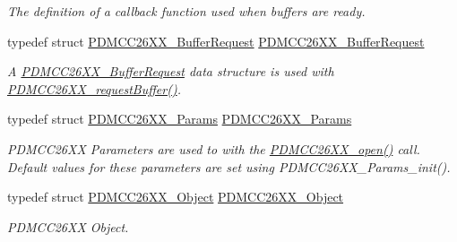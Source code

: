 \begin{DoxyCompactItemize}
\begin{DoxyCompactList}\small\item\em The definition of a callback function used when buffers are ready. \end{DoxyCompactList}\item 
typedef struct \hyperlink{struct_p_d_m_c_c26_x_x___buffer_request}{P\+D\+M\+C\+C26\+X\+X\+\_\+\+Buffer\+Request} \hyperlink{_p_d_m_c_c26_x_x_8h_ae8cebf1f4b5897234e3be6744eb26997}{P\+D\+M\+C\+C26\+X\+X\+\_\+\+Buffer\+Request}
\begin{DoxyCompactList}\small\item\em A \hyperlink{struct_p_d_m_c_c26_x_x___buffer_request}{P\+D\+M\+C\+C26\+X\+X\+\_\+\+Buffer\+Request} data structure is used with \hyperlink{_p_d_m_c_c26_x_x_8h_a15a0017513c13ca244f7e3a0f5761e8d}{P\+D\+M\+C\+C26\+X\+X\+\_\+request\+Buffer()}. \end{DoxyCompactList}\item 
typedef struct \hyperlink{struct_p_d_m_c_c26_x_x___params}{P\+D\+M\+C\+C26\+X\+X\+\_\+\+Params} \hyperlink{_p_d_m_c_c26_x_x_8h_a31104648f1849f5eef36ef1d98465a6b}{P\+D\+M\+C\+C26\+X\+X\+\_\+\+Params}
\begin{DoxyCompactList}\small\item\em P\+D\+M\+C\+C26\+X\+X Parameters are used to with the \hyperlink{_p_d_m_c_c26_x_x_8h_a431d9b71e0d0eebd5ab85960f1c82ee0}{P\+D\+M\+C\+C26\+X\+X\+\_\+open()} call. Default values for these parameters are set using P\+D\+M\+C\+C26\+X\+X\+\_\+\+Params\+\_\+init(). \end{DoxyCompactList}\item 
typedef struct \hyperlink{struct_p_d_m_c_c26_x_x___object}{P\+D\+M\+C\+C26\+X\+X\+\_\+\+Object} \hyperlink{_p_d_m_c_c26_x_x_8h_a8faebd80770af564015834b59c2d3414}{P\+D\+M\+C\+C26\+X\+X\+\_\+\+Object}
\begin{DoxyCompactList}\small\item\em P\+D\+M\+C\+C26\+X\+X Object. \end{DoxyCompactList}\end{DoxyCompactItemize}
